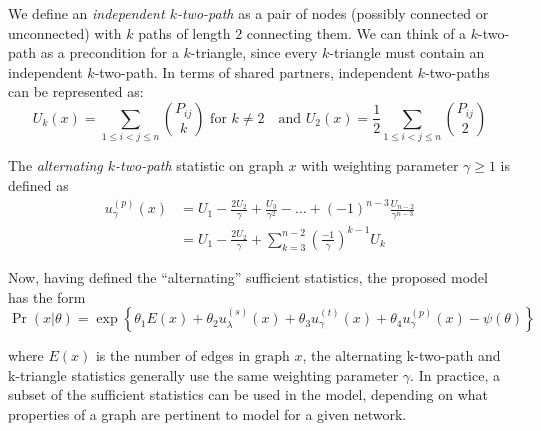 We define an \emph{independent $k$-two-path} as a pair of nodes (possibly connected or unconnected) with $k$ paths of length $2$ connecting them. We can think of a $k$-two-path as a precondition for a $k$-triangle, since every $k$-triangle must contain an independent $k$-two-path. In terms of shared partners, independent $k$-two-paths can be represented as:
\begin{equation}
\label{eq:k-two-path}
U_k(x) = \sum_{1 \leq i < j \leq n} \binom{P_{ij}}{k} \text{ for } k \not= 2 \quad \text{and } U_2(x) = \frac{1}{2} \sum_{1 \leq i < j \leq n} \binom{P_{ij}}{2}
\end{equation}

\begin{definition}
	\label{def:altktwopath}
	The \emph{alternating $k$-two-path} statistic on graph $x$ with weighting parameter $\gamma \geq 1$ is defined as 
	\begin{align*}
	u^{(p)}_\gamma(x) & = U_1 - \frac{2 U_2}{\gamma}   + \frac{U_3}{\gamma^2} - \dots + (-1)^{n-3} \frac{U_{n-2}}{\gamma^{n-3}} \\
	&  = U_1 - \frac{2 U_2}{\gamma} + \sum_{k = 3}^{n-2} \left(\frac{-1}{\gamma}\right)^{k-1} U_k
	\end{align*}
\end{definition}

Now, having defined the ``alternating'' sufficient statistics, the proposed model has the form
\begin{equation}
\label{eq:ergm_alt_stats}
\Pr(x | \theta) = \exp\left\{\theta_1 E(x) + \theta_2 u_\lambda^{(s)}(x) + \theta_3 u_\gamma^{(t)}(x)  + \theta_4 u_\gamma^{(p)}(x) - \psi(\theta)  \right\}
\end{equation}

where $E(x)$ is the number of edges in graph $x$, the alternating k-two-path and k-triangle statistics generally use the same weighting parameter $\gamma$. In practice, a subset of the sufficient statistics can be used in the model, depending on what properties of a graph are pertinent to model for a given network. 

